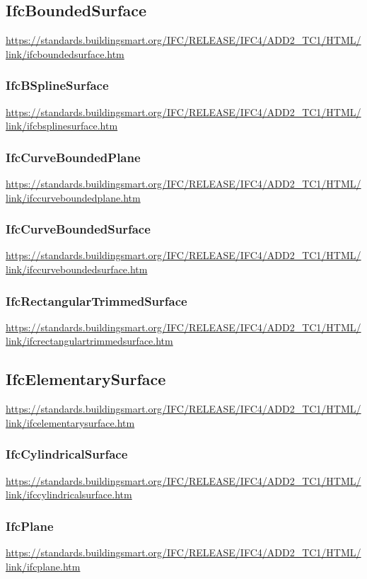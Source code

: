 \documentclass[spanish,12pt,a4paper,final,oneside]{book}
\begin{document}
\subsection{IfcBoundedSurface}
\url{https://standards.buildingsmart.org/IFC/RELEASE/IFC4/ADD2_TC1/HTML/link/ifcboundedsurface.htm}

\subsubsection{IfcBSplineSurface}
\url{https://standards.buildingsmart.org/IFC/RELEASE/IFC4/ADD2_TC1/HTML/link/ifcbsplinesurface.htm}

\subsubsection{IfcCurveBoundedPlane}
\url{https://standards.buildingsmart.org/IFC/RELEASE/IFC4/ADD2_TC1/HTML/link/ifccurveboundedplane.htm}

\subsubsection{IfcCurveBoundedSurface}
\url{https://standards.buildingsmart.org/IFC/RELEASE/IFC4/ADD2_TC1/HTML/link/ifccurveboundedsurface.htm}

\subsubsection{IfcRectangularTrimmedSurface}
\url{https://standards.buildingsmart.org/IFC/RELEASE/IFC4/ADD2_TC1/HTML/link/ifcrectangulartrimmedsurface.htm}


\subsection{IfcElementarySurface}
\url{https://standards.buildingsmart.org/IFC/RELEASE/IFC4/ADD2_TC1/HTML/link/ifcelementarysurface.htm}

\subsubsection{IfcCylindricalSurface}
\url{https://standards.buildingsmart.org/IFC/RELEASE/IFC4/ADD2_TC1/HTML/link/ifccylindricalsurface.htm}

\subsubsection{IfcPlane}
\url{https://standards.buildingsmart.org/IFC/RELEASE/IFC4/ADD2_TC1/HTML/link/ifcplane.htm}
\end{document}
